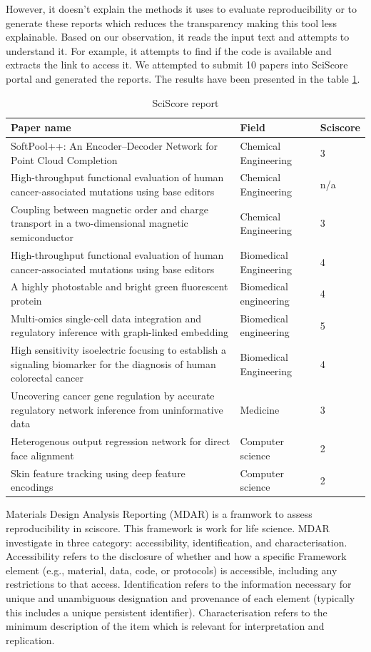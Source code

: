 \documentclass[
10pt, %
a4paper, %
oneside, %
headinclude,footinclude, %
BCOR5mm, %
]{scrartcl}
\begin{document}
However, it doesn't explain the methods it uses to evaluate reproducibility or to generate these reports which reduces the transparency making this tool less explainable.
Based on our observation, it reads the input text and attempts to understand it.  
For example, it attempts to find if the code is available and extracts the link to access it.
We attempted to submit 10 papers into SciScore portal and generated the reports. 
The results have been presented in the table \ref{table:sciscore_report}.
\begin{table}[!htb]
\caption{SciScore report}
\label{table:sciscore_report}
\begin{tabular}[t]{|p{9cm}|p{3cm}|p{1.3cm}|}
\hline
Paper name & Field & Sciscore \\
\hline
SoftPool++: An Encoder–Decoder Network for Point Cloud Completion & Chemical Engineering & 3\\
High-throughput functional evaluation of human cancer-associated mutations using base editors & Chemical Engineering & n/a\\
Coupling between magnetic order and charge transport in a two-dimensional magnetic semiconductor &  Chemical Engineering & 3 \\
High-throughput functional evaluation of human cancer-associated mutations using base editors &  Biomedical Engineering & 4 \\
A highly photostable and bright green fluorescent protein & Biomedical engineering &  4  \\
Multi-omics single-cell data integration and regulatory inference with graph-linked embedding & Biomedical engineering & 5 \\
High sensitivity isoelectric focusing to establish a signaling biomarker for the diagnosis of human colorectal cancer & Biomedical Engineering & 4\\
Uncovering cancer gene regulation by accurate regulatory network inference from uninformative data	 & Medicine & 3\\
Heterogenous output regression network for direct face alignment & Computer science & 2 \\
Skin feature tracking using deep feature encodings &  Computer science & 2 \\	\hline
\end{tabular}
\end{table}

Materials Design Analysis Reporting (MDAR) is a framwork to assess reproducibility in sciscore. 
This framework is work for life science. MDAR investigate in three category: accessibility, 
identification, and characterisation. Accessibility refers to the disclosure of whether and how a
specific Framework element (e.g., material, data, code, or protocols) is accessible, including any
restrictions to that access. Identification refers to the information necessary for unique and
unambiguous designation and provenance of each element (typically this includes a unique persistent identifier).
Characterisation refers to the minimum description of the item which is relevant for interpretation and replication.
\end{document}
